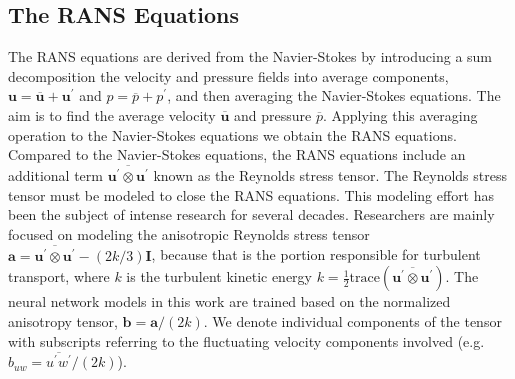 \documentclass[11pt]{article}
\numberwithin{equation}{section}
\theoremstyle{plain}
\theoremstyle{definition}
\begin{document}
\subsection{The RANS Equations}
\label{subsec:The RANS equations}

The RANS equations are derived from the Navier-Stokes by introducing a sum decomposition the velocity and pressure fields into average components, $\mathbf{u}=\overline{\mathbf{u}}+\mathbf{u^{\prime} }$ and $p=\overline{p}+p^{\prime}$, and then averaging the Navier-Stokes equations. The aim is to find the average velocity  $\overline{\mathbf{u}}$ and pressure $\overline{p}$. Applying this averaging operation to the Navier-Stokes equations we obtain the RANS equations. Compared to the Navier-Stokes equations, the RANS equations include an additional term $\overline{\mathbf{u^{\prime}}\otimes\mathbf{u^{\prime}}}$ known as the Reynolds stress tensor. The Reynolds stress tensor must be modeled to close the RANS equations. This modeling effort has been the subject of intense research for several decades. Researchers are mainly focused on modeling the anisotropic Reynolds stress tensor $\mathbf{a}=\overline{\mathbf{u^{\prime}}\otimes\mathbf{u^{\prime}}}-(2k/3)\mathbf{I}$, because that is the portion responsible for turbulent transport, where $k$ is the turbulent kinetic energy $k=\frac{1}{2}\text{trace} (\overline{\mathbf{u^{\prime}}\otimes\mathbf{u^{\prime}}})$. The neural network models in this work are trained based on the normalized anisotropy tensor, $\mathbf{b} = \mathbf{a}/(2k)$. We denote individual components of the tensor with subscripts referring to the fluctuating velocity components involved (e.g. $b_{uw} = \overline{u^{\prime}w^{\prime}} / (2k)$).
\end{document}
